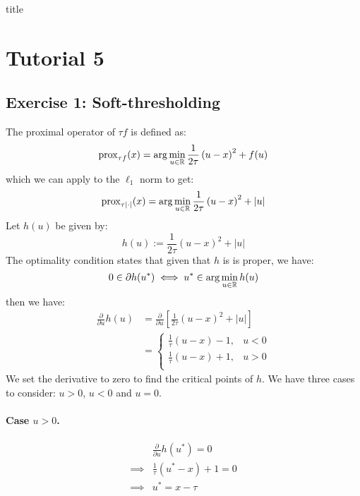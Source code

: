 \documentclass[12pt]{article}
\newcommand{\prox}{\operatorname{prox}}
\begin{document}
{title}

\tableofcontents




\section{Tutorial 5}
\subsection{Exercise 1: Soft-thresholding}
\label{sec:soft-thresholding}
The proximal operator of $\tau f$ is defined as:
\begin{equation*}
  \prox_{\tau f}(x) = \arg\min_{u \in \R} \frac{1}{2\tau}\left(u-x \right)^2 + f(u)
\end{equation*}
which we can apply to the $\ell_1$ norm to get:
\begin{equation*}
  \prox_{\tau |\cdot|}(x) = \arg\min_{u \in \R} \frac{1}{2\tau}\left(u-x \right)^2 + |u|
\end{equation*}
Let $h(u)$ be given by:
$$
  h(u) := \frac{1}{2\tau}\left(u-x \right)^2 + |u|
$$
The optimality condition states that given that $h$ is is proper, we have:
\begin{equation*}
  0 \in \partial h(u^*) \iff u^* \in \arg \min_{u \in \mathbb{R}} h(u)
\end{equation*}
then we have:
\begin{align*}
  \frac{\partial}{\partial u} h(u)
   & = \frac{\partial}{\partial u}  \left[\frac{1}{2\tau}\left(u-x \right)^2 + |u| \right] \\
   & =
  \begin{cases}
    \frac{1}{\tau}(u-x) - 1,  & u < 0 \\
    \frac{1}{\tau} (u-x) + 1, & u > 0 \\
  \end{cases}
\end{align*}
We set the derivative to zero to find the critical points of $h$. We have three cases to consider: $u > 0$, $u < 0$ and $u = 0$.
\paragraph{Case $u > 0$.}
\begin{align*}
           &
  \frac{\partial}{\partial u}  h(u^*) = 0 \\
  \implies &
  \frac{1}{\tau} (u^*-x) + 1 = 0          \\
  \implies &
  u^* = x - \tau                          \\
\end{align*}
\end{document}
